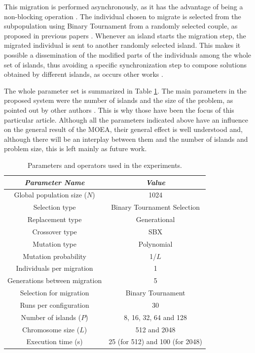 \documentclass[preprint]{elsarticle}
\begin{document}
This migration
  is performed asynchronously, as it has the advantage of being a
  non-blocking operation \cite{TalbiUnified2018}. The individual
  chosen to migrate is selected from the subpopulation using Binary
  Tournament from a randomly selected couple, as proposed in previous papers
  \cite{xiong2003parallel,Xiao03specialized}. Whenever an island
  starts the migration step, the migrated individual is sent to
  another randomly selected island. This makes it possible a
  dissemination of the modified parts of the individuals among the
  whole set of islands, thus avoiding a specific synchronization step
  to compose solutions obtained by different islands, as occurs other
  works \cite{Dorronsoro13superlinear}.

 The whole parameter set is summarized in Table \ref{tab:parameters}. 
The main parameters in the proposed system were the number of islands and the size
   of the problem, as pointed out by other authors 
   \cite{CaoZLL17,Dorronsoro13superlinear,DorronsoroPSO2018,Martens13asynchronous,Durillo08masterslave}. This is why those have been the focus of this particular
   article. Although all the parameters indicated above have an
   influence on the general result of the MOEA, their general effect
   is well understood and, although there will be an interplay between
 them and the number of islands and problem size, this is left mainly
 as future work.






\begin{table}[htb]
\begin{center}
\begin{tabular}{|c|c|}
\hline
{\em Parameter Name} & {\em Value} \\ \hline
Global population size ($N$) & 1024 \\ \hline
Selection type & Binary Tournament Selection \\ \hline
Replacement type & Generational \\ \hline 
Crossover type & SBX \\ \hline
Mutation  type & Polynomial\\ \hline
Mutation probability & 1/$L$ \\ \hline
Individuals per migration & 1 \\ \hline
Generations between migration & 5 \\ \hline
Selection for migration & Binary Tournament\\ \hline
Runs per configuration & 30 \\ \hline \hline
Number of islands ($P$) & 8, 16, 32, 64 and 128 \\ \hline
Chromosome size ($L$) & 512 and 2048 \\ \hline
Execution time (s) & 25 (for 512) and 100 (for 2048) \\ \hline \hline
\end{tabular}
\caption{Parameters and operators used in the experiments.}
\label{tab:parameters}
\end{center}
\end{table}
\end{document}
